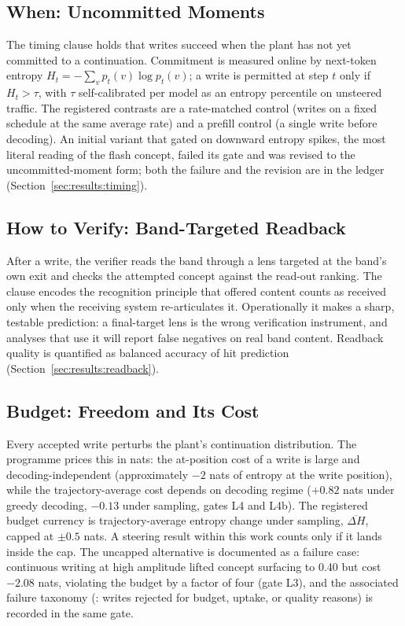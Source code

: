 \subsection{When: Uncommitted Moments}
\label{sec:doctrine:when}

The timing clause holds that writes succeed when the plant has not yet committed to a continuation. Commitment is measured online by next-token entropy $H_t = -\sum_v p_t(v)\log p_t(v)$; a write is permitted at step $t$ only if $H_t > \tau$, with $\tau$ self-calibrated per model as an entropy percentile on unsteered traffic. The registered contrasts are a rate-matched control (writes on a fixed schedule at the same average rate) and a prefill control (a single write before decoding). An initial variant that gated on downward entropy spikes, the most literal reading of the flash concept, failed its gate and was revised to the uncommitted-moment form; both the failure and the revision are in the ledger (Section~\ref{sec:results:timing}).

\subsection{How to Verify: Band-Targeted Readback}

After a write, the verifier reads the band through a lens targeted at the band's own exit and checks the attempted concept against the read-out ranking. The clause encodes the recognition principle that offered content counts as received only when the receiving system re-articulates it. Operationally it makes a sharp, testable prediction: a final-target lens is the wrong verification instrument, and analyses that use it will report false negatives on real band content. Readback quality is quantified as balanced accuracy of hit prediction (Section~\ref{sec:results:readback}).

\subsection{Budget: Freedom and Its Cost}
\label{sec:doctrine:budget}

Every accepted write perturbs the plant's continuation distribution. The programme prices this in nats: the at-position cost of a write is large and decoding-independent (approximately $-2$ nats of entropy at the write position), while the trajectory-average cost depends on decoding regime ($+0.82$ nats under greedy decoding, $-0.13$ under sampling, gates L4 and L4b). The registered budget currency is trajectory-average entropy change under sampling, $\overline{\Delta H}$, capped at $\pm 0.5$ nats. A steering result within this work counts only if it lands inside the cap. The uncapped alternative is documented as a failure case: continuous writing at high amplitude lifted concept surfacing to 0.40 but cost $-2.08$ nats, violating the budget by a factor of four (gate L3), and the associated failure taxonomy (: writes rejected for budget, uptake, or quality reasons) is recorded in the same gate.

